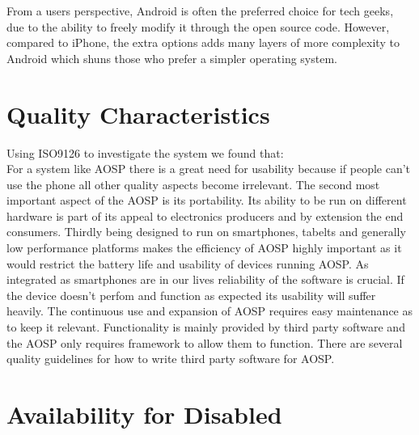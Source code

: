 \documentclass[conference]{IEEEtran}
\begin{document}
From a users perspective, Android is often the preferred choice for tech geeks, due to the ability to freely modify it through the open source code. However, compared to iPhone, the extra options adds many layers of more complexity to Android which shuns those who prefer a simpler operating system. 


\section{Quality Characteristics}
\label{quality}

Using ISO9126\cite{jung2004} to investigate the system we found that: \\
For a system like AOSP there is a great need for usability because if people can't use the phone all other quality aspects become irrelevant. The second most important aspect of the AOSP is its portability. Its ability to be run on different hardware is part of its appeal to electronics producers and by extension the end consumers. Thirdly being designed to run on smartphones, tabelts and generally low performance platforms makes the efficiency of AOSP highly important as it would restrict the battery life and usability of devices running AOSP. As integrated as smartphones are in our lives reliability of the software is crucial. If the device doesn't perfom and function as expected its usability will suffer heavily. The continuous use and expansion of AOSP requires easy maintenance as to keep it relevant. Functionality is mainly provided by third party software and the AOSP only requires framework to allow them to function. There are several quality guidelines for how to write third party software for AOSP\cite{android-quality}.


\section{Availability for Disabled}
\label{availability}
\end{document}
